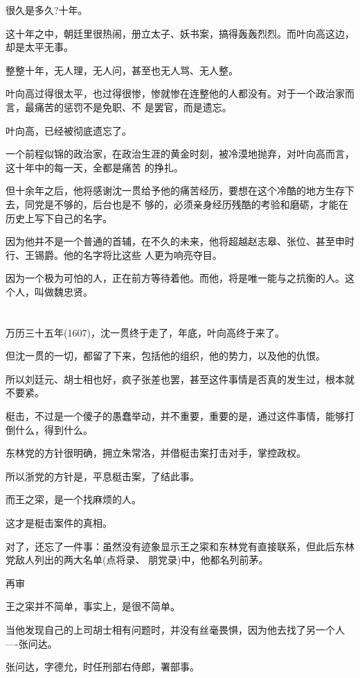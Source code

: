 \documentclass[11pt,a4paper,onecolumn]{article}
\begin{document}
很久是多久?十年。

这十年之中，朝廷里很热闹，册立太子、妖书案，搞得轰轰烈烈。而叶向高这边，却是太平无事。

整整十年，无人理，无人问，甚至也无人骂、无人整。

叶向高过得很太平，也过得很惨，惨就惨在连整他的人都没有。对于一个政治家而言，最痛苦的惩罚不是免职、不
是罢官，而是遗忘。

叶向高，已经被彻底遗忘了。

一个前程似锦的政治家，在政治生涯的黄金时刻，被冷漠地抛弃，对叶向高而言，这十年中的每一天，全都是痛苦
的挣扎。

但十余年之后，他将感谢沈一贯给予他的痛苦经历，要想在这个冷酷的地方生存下去，同党是不够的，后台也是不
够的，必须亲身经历残酷的考验和磨砺，才能在历史上写下自己的名字。

因为他并不是一个普通的首辅，在不久的未来，他将超越赵志皋、张位、甚至申时行、王锡爵。他的名字将比这些
人更为响亮夺目。

因为一个极为可怕的人，正在前方等待着他。而他，将是唯一能与之抗衡的人。这个人，叫做魏忠贤。

\section[\thesection]{}

万历三十五年(1607)，沈一贯终于走了，年底，叶向高终于来了。

但沈一贯的一切，都留了下来，包括他的组织，他的势力，以及他的仇恨。

所以刘廷元、胡士相也好，疯子张差也罢，甚至这件事情是否真的发生过，根本就不要紧。

梃击，不过是一个傻子的愚蠢举动，并不重要，重要的是，通过这件事情，能够打倒什么，得到什么。

东林党的方针很明确，拥立朱常洛，并借梃击案打击对手，掌控政权。

所以浙党的方针是，平息梃击案，了结此事。

而王之寀，是一个找麻烦的人。

这才是梃击案件的真相。

对了，还忘了一件事：虽然没有迹象显示王之寀和东林党有直接联系，但此后东林党敌人列出的两大名单(点将录、
朋党录)中，他都名列前茅。

再审

王之寀并不简单，事实上，是很不简单。

当他发现自己的上司胡士相有问题时，并没有丝毫畏惧，因为他去找了另一个人----张问达。

张问达，字德允，时任刑部右侍郎，署部事。
\end{document}
